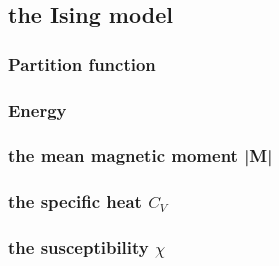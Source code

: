 
\subsection{the Ising model}

\subsubsection{Partition function}

\subsubsection{Energy}

\subsubsection{the mean magnetic moment |M|}

\subsubsection{the specific heat $C_V$}

\subsubsection{the susceptibility $\chi$}



















